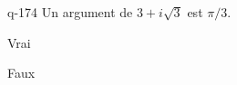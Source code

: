 \begin{truefalse}{q-174}
Un argument de $3+i\sqrt{3}$ est $\pi/3$.
\item Vrai
\item* Faux
\end{truefalse}

